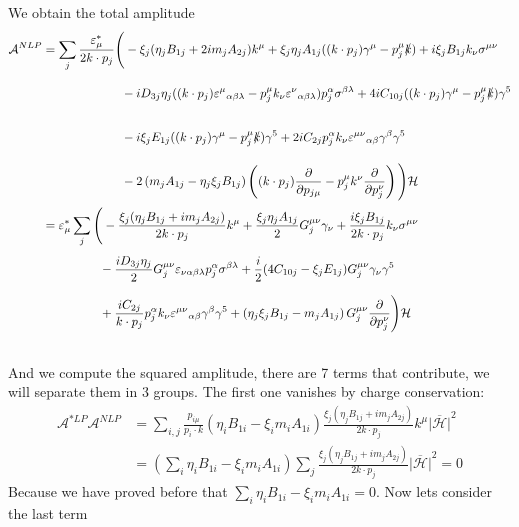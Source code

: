 \documentclass{article}
\newcommand{\s}[1]{\slashed #1}
\begin{document}
We obtain the total amplitude
\begin{align*}
	\mathcal{A}^{NLP}& = \sum_j\frac{\varepsilon^*_\mu}{2k\cdot p_j}\Bigg(- \xi_j(\eta_j B_{1j} + 2 im_jA_{2j}) k^\mu + \xi_j\eta_j A_{1j}((k\cdot p_j)\gamma^\mu - p_j^\mu\s{k}) +i\xi_j B_{1j}k_\nu \sigma^{\mu\nu} \\&\phantom{= \sum_j\frac{\varepsilon^*_\mu k_\nu}{2k\cdot p_j}\Bigg(}
	- iD_{3j}\eta_j((k\cdot p_j)\varepsilon^\mu{}_{\alpha\beta\lambda} - p_j^\mu k_\nu \varepsilon^{\nu}{}_{\alpha\beta\lambda}) p_j^\alpha \sigma^{\beta\lambda} + 4iC_{10j}((k\cdot p_j)\gamma^\mu - p_j^\mu\s{k}) \gamma^5 \\&\phantom{= \sum_j\frac{\varepsilon^*_\mu k_\nu}{2k\cdot p_j}\Bigg(}
	- i\xi_j E_{1j} ((k\cdot p_j)\gamma^\mu - p_j^\mu \s{k})\gamma^5 + 2iC_{2j}p^\alpha_jk_\nu\varepsilon^{\mu\nu}{}_{\alpha\beta}\gamma^\beta \gamma^5 \\&\phantom{= \sum_j\frac{\varepsilon^*_\mu k_\nu}{2k\cdot p_j}\Bigg(}
	-2\left(m_jA_{1j}-\eta_j\xi_j B_{1j}\right)\left((k\cdot p_j)\pdv{p_{j\mu}} - p^\mu_j k^\nu \pdv{p_{j}^\nu}\right)\Bigg) \mathcal{H} \\&
	= \varepsilon^*_\mu \sum_j\Bigg(-\frac{\xi_j(\eta_j B_{1j} + im_jA_{2j})}{2k\cdot p_j}k^\mu + \frac{\xi_j\eta_j A_{1j}}{2}G_j^{\mu\nu}\gamma_\nu +\frac{i\xi_j B_{1j}}{2k\cdot p_j}k_\nu \sigma^{\mu\nu} \\&\phantom{= \varepsilon^*_\mu \sum_j\Bigg(}
	- \frac{iD_{3j}\eta_j}{2}G_j^{\mu\nu}\varepsilon_{\nu\alpha\beta\lambda} p_j^\alpha \sigma^{\beta\lambda} + \frac{i}{2}(4C_{10j}-\xi_j E_{1j})G_j^{\mu\nu}\gamma_\nu \gamma^5 \\&\phantom{= \varepsilon^*_\mu \sum_j\Bigg(}
	+\frac{iC_{2j}}{k\cdot p_j}p^\alpha_jk_\nu\varepsilon^{\mu\nu}{}_{\alpha\beta}\gamma^\beta \gamma^5 +\left(\eta_j\xi_j B_{1j}-m_jA_{1j}\right)G_j^{\mu\nu}\pdv{p_{j}^\nu}\Bigg) \mathcal{H}
\end{align*}
\\
And we compute the squared amplitude, there are 7 terms that contribute, we will separate them in 3 groups. The first one vanishes by charge conservation:
\begin{align*}
	\mathcal{A}^{*LP}\mathcal{A}^{NLP} &= \sum_{i,j}\frac{p_{i\mu}}{p_i\cdot k}\left(\eta_iB_{1i}-\xi_im_iA_{1i}\right) \frac{\xi_j(\eta_j B_{1j} + im_jA_{2j})}{2k\cdot p_j}k^\mu \overline{|\mathcal{H}|}^2\\&
	=\left(\sum_{i}\eta_iB_{1i}-\xi_im_iA_{1i}\right) \sum_{j}\frac{\xi_j(\eta_j B_{1j} + im_jA_{2j})}{2k\cdot p_j} \overline{|\mathcal{H}|}^2 = 0
\end{align*}
Because we have proved before that $\sum_{i}\eta_iB_{1i}-\xi_im_iA_{1i}=0$. Now lets consider the last term
\end{document}
